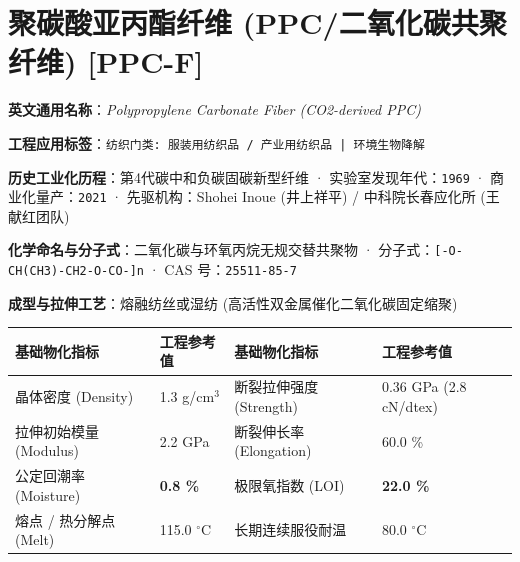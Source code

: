 \documentclass[11pt,openright,twoside,UTF8]{ctexbook}
\begin{document}
\section{聚碳酸亚丙酯纤维 (PPC/二氧化碳共聚纤维) [PPC-F]}
\label{sec:ppc-f}

\noindent\textbf{英文通用名称}：\textit{Polypropylene Carbonate Fiber (CO2-derived PPC)}\par
\noindent\textbf{工程应用标签}：\texttt{纺织门类: 服装用纺织品 / 产业用纺织品 | 环境生物降解}\par
\noindent\textbf{历史工业化历程}：第4代碳中和负碳固碳新型纤维 · 实验室发现年代：\texttt{1969} · 商业化量产：\texttt{2021} · 先驱机构：Shohei Inoue (井上祥平) / 中科院长春应化所 (王献红团队)\par
\noindent\textbf{化学命名与分子式}：二氧化碳与环氧丙烷无规交替共聚物 · 分子式：\texttt{[-O-CH(CH3)-CH2-O-CO-]n} · CAS 号：\texttt{25511-85-7}\par
\noindent\textbf{成型与拉伸工艺}：熔融纺丝或湿纺 (高活性双金属催化二氧化碳固定缩聚)\par

\vspace{0.15cm}
\begin{center}
\small
\begin{tabularx}{\textwidth}{p{3.8cm}Xp{3.8cm}X}
\toprule
\textbf{基础物化指标} & \textbf{工程参考值} & \textbf{基础物化指标} & \textbf{工程参考值} \\
\midrule
晶体密度 (Density) & 1.3 g/cm$^3$ & 断裂拉伸强度 (Strength) & 0.36 GPa (2.8 cN/dtex) \\
拉伸初始模量 (Modulus) & 2.2 GPa & 断裂伸长率 (Elongation) & 60.0 \% \\
公定回潮率 (Moisture) & \textbf{0.8 \%} & 极限氧指数 (LOI) & \textbf{22.0 \%} \\
熔点 / 热分解点 (Melt) & 115.0 $^\circ\mathrm{C}$ & 长期连续服役耐温 & 80.0 $^\circ\mathrm{C}$ \\
\bottomrule
\end{tabularx}
\end{center}
\vspace{0.15cm}
\end{document}

